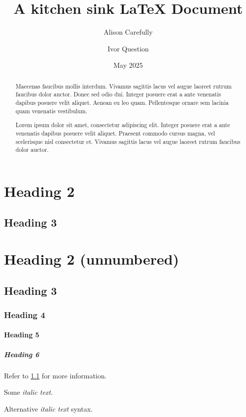 \documentclass{article}
\theoremstyle{definition}
\theoremstyle{remark}
\begin{document}
\title{A kitchen sink LaTeX Document}
\date{May 2025}
\author[1]{Alison Carefully }
\author[2]{Ivor Question }
\maketitle

\begin{abstract}
Maecenas faucibus mollis interdum. Vivamus sagittis lacus vel augue laoreet rutrum faucibus dolor auctor. Donec sed odio dui. Integer posuere erat a ante venenatis dapibus posuere velit aliquet. Aenean eu leo quam. Pellentesque ornare sem lacinia quam venenatis vestibulum.

Lorem ipsum dolor sit amet, consectetur adipiscing elit. Integer posuere erat a ante venenatis dapibus posuere velit aliquet. Praesent commodo cursus magna, vel scelerisque nisl consectetur et. Vivamus sagittis lacus vel augue laoreet rutrum faucibus dolor auctor.
\end{abstract}

\section{Heading 2}
\subsection{Heading 3} \label{sec:bravo}
\section*{Heading 2 (unnumbered)}
\subsection{Heading 3}
\subsubsection{Heading 4}
\paragraph{Heading 5}
\subparagraph{Heading 6}

Refer to \cref{sec:bravo} for more information.

Some \emph{italic text}.

Alternative {\em italic text} syntax.
\end{document}
